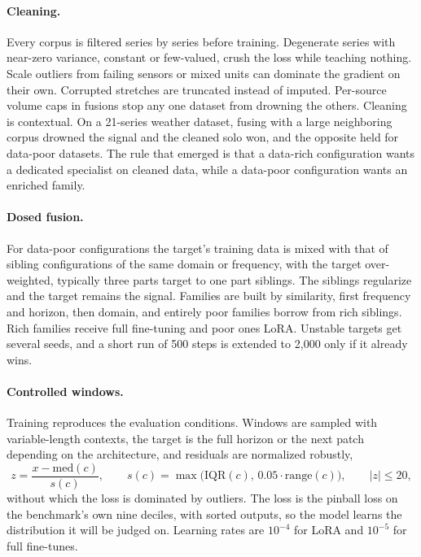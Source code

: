 \documentclass[11pt]{article}
\begin{document}
\paragraph{Cleaning.} Every corpus is filtered series by series before
training. Degenerate series with near-zero variance, constant or
few-valued, crush the loss while teaching nothing. Scale outliers from
failing sensors or mixed units can dominate the gradient on their own.
Corrupted stretches are truncated instead of imputed. Per-source volume
caps in fusions stop any one dataset from drowning the others. Cleaning is
contextual. On a 21-series weather dataset, fusing with a large
neighboring corpus drowned the signal and the cleaned solo won, and the
opposite held for data-poor datasets. The rule that emerged is that a
data-rich configuration wants a dedicated specialist on cleaned data,
while a data-poor configuration wants an enriched family.

\paragraph{Dosed fusion.} For data-poor configurations the target's
training data is mixed with that of sibling configurations of the same
domain or frequency, with the target over-weighted, typically three parts
target to one part siblings. The siblings regularize and the target
remains the signal. Families are built by similarity, first frequency and
horizon, then domain, and entirely poor families borrow from rich
siblings. Rich families receive full fine-tuning and poor ones LoRA.
Unstable targets get several seeds, and a short run of 500 steps is
extended to 2{,}000 only if it already wins.

\paragraph{Controlled windows.} Training reproduces the evaluation
conditions. Windows are sampled with variable-length contexts, the target
is the full horizon or the next patch depending on the architecture, and
residuals are normalized robustly,
\[
z=\frac{x-\mathrm{med}(c)}{s(c)},\qquad
s(c)=\max\bigl(\mathrm{IQR}(c),\,0.05\cdot\mathrm{range}(c)\bigr),\qquad
|z|\le 20,
\]
without which the loss is dominated by outliers. The loss is the pinball
loss on the benchmark's own nine deciles, with sorted outputs, so the
model learns the distribution it will be judged on. Learning rates are
$10^{-4}$ for LoRA and $10^{-5}$ for full fine-tunes.
\end{document}
